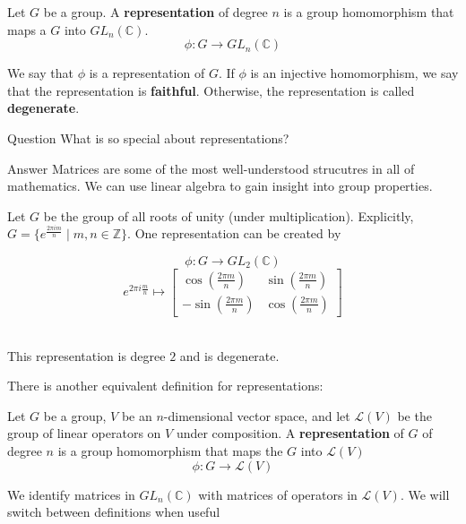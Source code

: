 \documentclass[compress,aspectratio=169,10pt,usenames,dvipsnames]{beamer}
\newcommand{\Z}{\mathbb{Z}}
\newcommand{\C}{\mathbb{C}}
\begin{document}
\begin{frame}
	\vfill
	\begin{definition}
	 Let $G$ be a group. A \textbf{representation} of degree $n$ is a group homomorphism that maps a $G$ into $GL_n(\mathbb{C}).$
	$$\phi:G\rightarrow GL_n(\mathbb{C})$$
	\end{definition}
	\vfill	
	We say that $\phi$ is a representation of $G$. 
	\vfill
	If $\phi$ is an injective homomorphism, we say that the representation is \textbf{faithful}. Otherwise, the representation is called \textbf{degenerate}.
	\vfill
\end{frame}


\begin{frame}
	\vfill
	\begin{block}{Question}
		What is so special about representations?
	\end{block}
	\vfill
	\begin{block}{Answer}
		Matrices are some of the most well-understood strucutres in all of mathematics. We can use linear algebra to gain insight into group properties.
	\end{block}
\end{frame}

\begin{frame}
\vfill
\begin{example}
Let $G$ be the group of all roots of unity (under multiplication). Explicitly, $G=\{e^{\frac{2\pi im }{n}}\mid m,n\in\Z\}$. One representation can be created by
\vfill
	\renewcommand{\arraystretch}{1.25}

$$\phi:G\rightarrow GL_2(\mathbb{C})$$%
$$e^{2\pi i\frac{m}{n}}\mapsto \begin{bmatrix}
							\cos(\frac{2\pi m}{n}) & \sin(\frac{2\pi m}{n}) \\
							-\sin(\frac{2\pi m}{n}) & \cos(\frac{2\pi m}{n})
						      \end{bmatrix}$$\\
\end{example}
\vfill
This representation is degree $2$ and is degenerate.
\vfill
\end{frame}


\begin{frame}
\vfill
There is another equivalent definition for representations:
\vfill
\begin{definition}
	Let $G$ be a group, $V$ be an $n$-dimensional vector space, and let $\mathcal{L}(V)$ be the group of linear operators on $V$ under composition. A \textbf{representation} of $G$ of degree $n$ is a group homomorphism that maps the $G$ into $\mathcal{L}(V)$
$$\phi: G \rightarrow \mathcal{L}(V) $$
\end{definition}
\vfill

We identify matrices in $GL_n(\C)$ with matrices of operators in $\mathcal{L}(V)$.
\vfill
We will switch between definitions when useful
\vfill
\end{frame}
\end{document}
